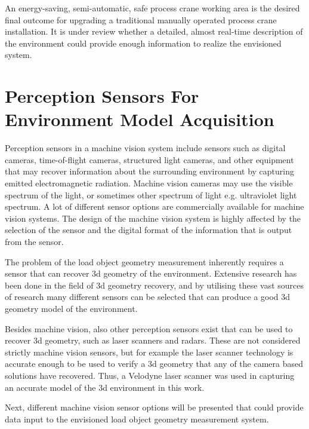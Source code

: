 \documentclass[12pt,a4paper,oneside,pdftex]{report}
\begin{document}

An energy-saving, semi-automatic, safe process crane working area is the desired final outcome for upgrading a traditional manually operated process crane installation. It is under review whether a detailed, almost real-time description of the environment could provide enough information to realize the envisioned system.

\chapter{Perception Sensors For Environment Model Acquisition}
\label{chapter:perception_sensors_for_environment_model_acquisition}

Perception sensors in a machine vision system include sensors such as digital cameras, time-of-flight cameras, structured light cameras, and other equipment that may recover information about the surrounding environment by capturing emitted electromagnetic radiation. Machine vision cameras may use the visible spectrum of the light, or sometimes other spectrum of light e.g. ultraviolet light spectrum. A lot of different sensor options are commercially available for machine vision systems. The design of the machine vision system is highly affected by the selection of the sensor and the digital format of the information that is output from the sensor.

The problem of the load object geometry measurement inherently requires a sensor that can recover 3d geometry of the environment. Extensive research has been done in the field of 3d geometry recovery, and by utilising these vast sources of research many different sensors can be selected that can produce a good 3d geometry model of the environment.

Besides machine vision, also other perception sensors exist that can be used to recover 3d geometry, such as laser scanners and radars. These are not considered strictly machine vision sensors, but for example the laser scanner technology is accurate enough to be used to verify a 3d geometry that any of the camera based solutions have recovered. Thus, a Velodyne laser scanner was used in capturing an accurate model of the 3d environment in this work.

Next, different machine vision sensor options will be presented that could provide data input to the envisioned load object geometry measurement system.
\end{document}
